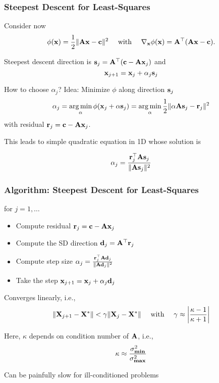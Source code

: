 \documentclass[12pt,fleqn]{beamer}
\begin{document}


\begin{frame}\frametitle{Steepest Descent for Least-Squares}

Consider now
$$ \phi({\bf x}) = {\frac 12} \|{\bf A} {\bf x} - {\bf c}\|^2 \quad \text{ with } \quad \nabla_{{\bf x}} \phi({\bf x}) = {\bf A}^{\top}({\bf A} {\bf x} -  {\bf c}).$$

\bigskip

Steepest descent direction is  ${\bf s}_j = {\bf A}^{\top}({\bf c} - {\bf A} {\bf x}_j)$ and
$$ {\bf x}_{j+1} = {\bf x}_j + \alpha_j {\bf s}_j $$

How to choose $\alpha_j$? 
\pause
Idea: Minimize $\phi$ along direction ${\bf s}_j$
$$ 
\alpha_j = \operatorname*{arg\,min}_\alpha \phi({\bf x}_j + \alpha {\bf s}_j) = 
 \operatorname*{arg\,min}_\alpha {\frac 12} \|\alpha {\bf A} {\bf s}_j - {\bf r}_j\|^2
$$
with residual ${\bf r}_j = {\bf c} - {\bf A} {\bf x}_j $.

\bigskip
\pause

This leads to simple quadratic equation in 1D whose solution is
 
  
$$ \alpha_j = {\frac { {\bf r}_j^{\top}{\bf A}{\bf s}_j}{\|{\bf A} {\bf s}_j\|^2}} $$


\end{frame}


\begin{frame}\frametitle{Algorithm: Steepest Descent for Least-Squares}


for $j=1,\ldots $
\begin{itemize}
\item Compute residual ${\bf r}_j = {\bf c} - {\bf A} {\bf x}_j$
\item Compute the SD direction ${\bf d}_j = {\bf A}^{\top}{\bf r}_j$
\item Compute step size  $\alpha_j = {\frac { {\bf r}_j^{\top}{\bf A}{\bf d}_j }{\|{\bf A} {\bf d}_j\|^2}}$
\item Take the step ${\bf x}_{j+1} = {\bf x}_j + \alpha_j {\bf d}_j$
\end{itemize}

\pause

Converges linearly, i.e., 
$$
	\| {\bf X}_{j+1} - {\bf X}^*\| < \gamma \|{\bf X}_j - {\bf X}^* \| \quad \text{ with } \quad \gamma \approx \left| {\frac {\kappa-1}{\kappa+1}} \right|
$$

Here, $\kappa$ depends on condition number of ${\bf A}$, i.e., 
$$ \kappa \approx {\frac {\sigma_{\bf min}^2}{\sigma_{\bf max}^2}} $$


Can be painfully slow for ill-conditioned problems

\end{frame}
\end{document}
